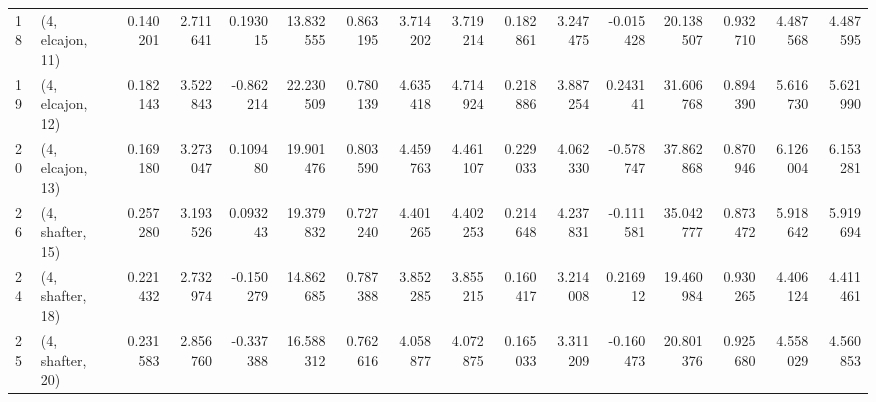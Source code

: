 \begin{tabular}{llrrrrrrrrrrrrrr}
18 &  (4, elcajon, 11) &   0.140201 &  2.711641 &  0.193015 &  13.832555 &  0.863195 &   3.714202 &  3.719214 &  0.182861 &   3.247475 & -0.015428 &   20.138507 &  0.932710 &   4.487568 &   4.487595 \\
19 &  (4, elcajon, 12) &   0.182143 &  3.522843 & -0.862214 &  22.230509 &  0.780139 &   4.635418 &  4.714924 &  0.218886 &   3.887254 &  0.243141 &   31.606768 &  0.894390 &   5.616730 &   5.621990 \\
20 &  (4, elcajon, 13) &   0.169180 &  3.273047 &  0.109480 &  19.901476 &  0.803590 &   4.459763 &  4.461107 &  0.229033 &   4.062330 & -0.578747 &   37.862868 &  0.870946 &   6.126004 &   6.153281 \\
26 &  (4, shafter, 15) &   0.257280 &  3.193526 &  0.093243 &  19.379832 &  0.727240 &   4.401265 &  4.402253 &  0.214648 &   4.237831 & -0.111581 &   35.042777 &  0.873472 &   5.918642 &   5.919694 \\
24 &  (4, shafter, 18) &   0.221432 &  2.732974 & -0.150279 &  14.862685 &  0.787388 &   3.852285 &  3.855215 &  0.160417 &   3.214008 &  0.216912 &   19.460984 &  0.930265 &   4.406124 &   4.411461 \\
25 &  (4, shafter, 20) &   0.231583 &  2.856760 & -0.337388 &  16.588312 &  0.762616 &   4.058877 &  4.072875 &  0.165033 &   3.311209 & -0.160473 &   20.801376 &  0.925680 &   4.558029 &   4.560853 \\
\bottomrule
\end{tabular}
